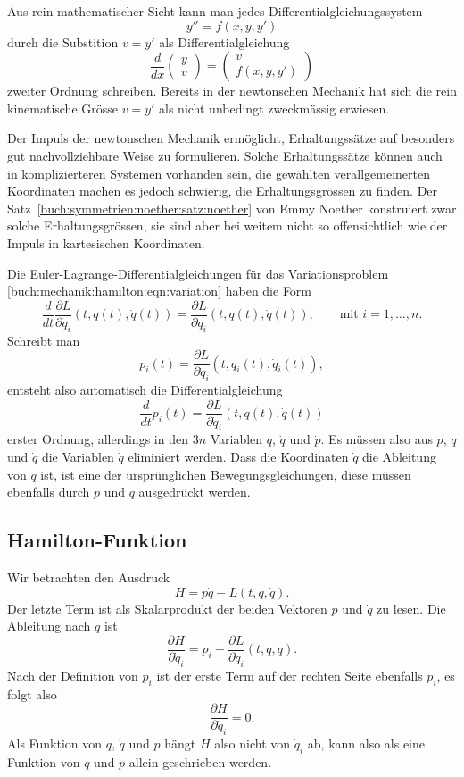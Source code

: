 Aus rein mathematischer Sicht kann man jedes Differentialgleichungssystem
\[
y'' = f(x,y,y')
\]
durch die Substition $v=y'$ als Differentialgleichung
\[
\frac{d}{dx}
\begin{pmatrix}
y\\ v
\end{pmatrix}
=
\begin{pmatrix}
v\\
f(x,y,y')
\end{pmatrix}
\]
zweiter Ordnung schreiben.
Bereits in der newtonschen Mechanik hat sich die rein kinematische
Grösse $v=y'$ als nicht unbedingt zweckmässig erwiesen.

Der Impuls der newtonschen Mechanik ermöglicht, Erhaltungssätze auf besonders
gut nachvollziehbare Weise zu formulieren.
Solche Erhaltungssätze können auch in komplizierteren Systemen
vorhanden sein, die gewählten verallgemeinerten Koordinaten machen
es jedoch schwierig, die Erhaltungsgrössen zu finden.
Der Satz~\ref{buch:symmetrien:noether:satz:noether} von Emmy Noether
konstruiert zwar solche Erhaltungsgrössen, sie sind aber bei weitem nicht
so offensichtlich wie der Impuls in kartesischen Koordinaten.

Die Euler-Lagrange-Differentialgleichungen für das Variationsproblem
\eqref{buch:mechanik:hamilton:eqn:variation} haben die Form
\[
\frac{d}{dt}
\frac{\partial L}{\partial \dot{q}_i}(t,q(t),\dot{q}(t))
=
\frac{\partial L}{\partial q_i}(t,q(t),\dot{q}(t)),\qquad
\text{mit $i=1,\dots,n$}.
\]
Schreibt man
\[
p_i(t)
= 
\frac{\partial L}{\partial \dot{q}_i}(t,q_i(t),\dot{q}_i(t)),
\]
entsteht also automatisch die Differentialgleichung
\[
\frac{d}{dt} p_i(t)
=
\frac{\partial L}{\partial \dot{q}_i}(t,q(t),\dot{q}(t))
\]
erster
Ordnung, allerdings in den $3n$ Variablen $q$, $\dot{q}$ und
$\dot{p}$.
Es müssen also aus $p$, $q$ und $\dot{q}$ die Variablen $\dot{q}$
eliminiert werden.
Dass die Koordinaten $\dot{q}$ die Ableitung von $q$ ist, ist eine
der ursprünglichen Bewegungsgleichungen, diese müssen ebenfalls durch
$p$ und $q$ ausgedrückt werden.

%
%
\subsection{Hamilton-Funktion}
Wir betrachten den Ausdruck
\[
H
=
p\dot{q}
-
L(t,q,\dot{q}).
\]
Der letzte Term ist als Skalarprodukt der beiden Vektoren $p$ und $\dot{q}$
zu lesen.
Die Ableitung nach $q$ ist
\[
\frac{\partial H}{\partial \dot{q}_i}
=
p_i
-
\frac{\partial L}{\partial \dot{q}_i}(t,q,\dot{q}).
\]
Nach der Definition von $p_i$ ist der erste Term auf der rechten Seite
ebenfalls $p_i$, es folgt also
\[
\frac{\partial H}{\partial \dot{q}_i} = 0.
\]
Als Funktion von $q$, $\dot{q}$ und $p$ hängt $H$ also nicht von $\dot{q}_i$
ab, kann also als eine Funktion von $q$ und $p$ allein geschrieben werden.

